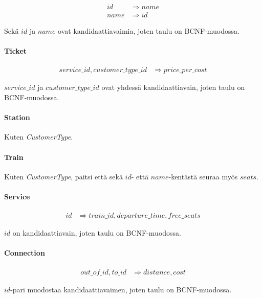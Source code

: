 \documentclass[a4paper,twoside,titlepage,12pt]{article}
\begin{document}
\begin{align*}
id &\Rightarrow name\\
name &\Rightarrow id
\end{align*}

Sekä $id$ ja $name$ ovat kandidaattiavaimia, joten taulu on BCNF-muodossa.

\paragraph{Ticket}

\begin{align*}
service\_id, customer\_type\_id &\Rightarrow price\_per\_cost
\end{align*}

$service\_id$ ja $customer\_type\_id$ ovat yhdessä kandidaattiavain, joten
taulu on BCNF-muodossa.

\paragraph{Station}

Kuten \emph{CustomerType}.

\paragraph{Train}

Kuten \emph{CustomerType}, paitsi että sekä $id$- että $name$-kentästä seuraa
myös $seats$.

\paragraph{Service}

\begin{align*}
id &\Rightarrow train\_id, departure\_time, free\_seats
\end{align*}

$id$ on kandidaattiavain, joten taulu on BCNF-muodossa.

\paragraph{Connection}

\begin{align*}
out\_of\_id, to\_id &\Rightarrow distance, cost
\end{align*}

$id$-pari muodostaa kandidaattiavaimen, joten taulu on BCNF-muodossa.
\end{document}
